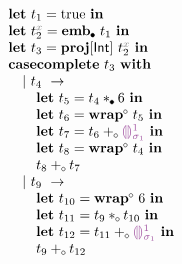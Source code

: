 


  \[\begin{array}{l}
    \ELet{t_1}{\ETrue} \EIn \\
    \ELet{\EVarNamed{2}{x}}{\EEmbedNC{t_1}} \EIn \\
    \ELet{t_3}{\EProj{\EVarNamed{2}{x}}{\TCInt}} \EIn \\

    \ECaseCompleteWith{t_3} \\
      \Indent \ECaseCompleteBranch{t_4}{} \\
        \Indent \Indent \ELet{t_5}{\ETimesNC{t_4}{6}} \EIn \\
        \Indent \Indent \ELet{t_6}{\EWrapIntoNI{t_5}} \EIn \\
        \Indent \Indent \ELet{t_7}{\EPlusNI{t_6}{\EEHole{1}{\sigma_1}}} \EIn \\
        \Indent \Indent \ELet{t_8}{\EWrapIntoNI{t_4}} \EIn \\
        \Indent \Indent \EPlusNI{t_8}{t_7} \\
      \Indent \ECaseCompleteBranch{t_{9}}{} \\
        \Indent \Indent \ELet{t_{10}}{\EWrapIntoNI{6}} \EIn \\
        \Indent \Indent \ELet{t_{11}}{\ETimesNI{t_{9}}{t_{10}}} \EIn \\
        \Indent \Indent \ELet{t_{12}}{\EPlusNI{t_{11}}{\EEHole{1}{\sigma_1}}} \EIn \\
        \Indent \Indent \EPlusNI{t_{9}}{t_{12}}
  \end{array}\]

